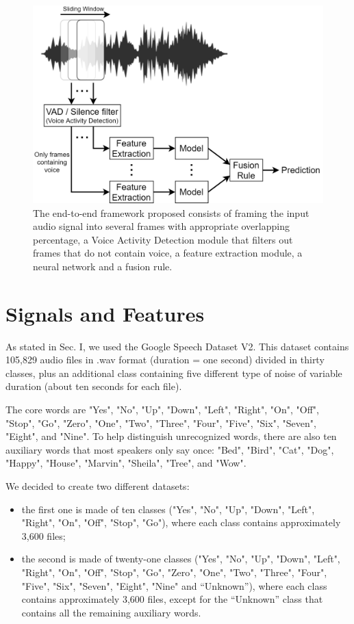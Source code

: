 \documentclass[conference]{IEEEtran}
\begin{document}
\begin{figure}
\centering
\includegraphics[scale=0.23]{End-To-End}
\caption{The end-to-end framework proposed consists of framing the input audio signal into several frames with appropriate overlapping percentage, a Voice Activity Detection module that filters out frames that do not contain voice, a feature extraction module, a neural network and a fusion rule.}
\end{figure}

\section{Signals and Features}
As stated in Sec. I, we used the Google Speech Dataset V2. This dataset contains 105,829 audio files in .wav format (duration =  one second) divided in thirty classes, plus an additional class containing five different type of noise of variable duration (about ten seconds for each file).

The core words are "Yes", "No", "Up", "Down", "Left", "Right", "On", "Off", "Stop", "Go", "Zero", "One", "Two", "Three", "Four", "Five", "Six", "Seven", "Eight", and "Nine". To help distinguish unrecognized words, there are also ten auxiliary words that most speakers only say once: "Bed", "Bird", "Cat", "Dog", "Happy", "House", "Marvin", "Sheila", "Tree", and "Wow".

We decided to create two different datasets:
\begin{itemize}
\item the first one is made of ten classes ("Yes", "No", "Up", "Down", "Left", "Right", "On", "Off", "Stop", "Go"), where each class contains approximately 3,600 files;
\item the second is made of twenty-one classes ("Yes", "No", "Up", "Down", "Left", "Right", "On", "Off", "Stop", "Go", "Zero", "One", "Two", "Three", "Four", "Five", "Six", "Seven", "Eight", "Nine" and “Unknown”), where each class contains approximately 3,600 files, except for the “Unknown” class that contains all the remaining auxiliary words.
\end{itemize}
\end{document}

